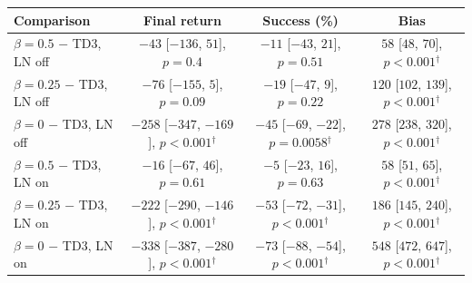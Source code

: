 \begin{tabular}{@{}lccc@{}}
\toprule
Comparison & Final return & Success (\%) & Bias \\
\midrule
$\beta = 0.5$ $-$ TD3, LN off & $-43$ {\scriptsize[$-136$, $51$]}, $p=0.4$ & $-11$ {\scriptsize[$-43$, $21$]}, $p=0.51$ & $58$ {\scriptsize[$48$, $70$]}, $p<0.001$$^\dagger$ \\
$\beta = 0.25$ $-$ TD3, LN off & $-76$ {\scriptsize[$-155$, $5$]}, $p=0.09$ & $-19$ {\scriptsize[$-47$, $9$]}, $p=0.22$ & $120$ {\scriptsize[$102$, $139$]}, $p<0.001$$^\dagger$ \\
$\beta = 0$ $-$ TD3, LN off & $-258$ {\scriptsize[$-347$, $-169$]}, $p<0.001$$^\dagger$ & $-45$ {\scriptsize[$-69$, $-22$]}, $p=0.0058$$^\dagger$ & $278$ {\scriptsize[$238$, $320$]}, $p<0.001$$^\dagger$ \\
$\beta = 0.5$ $-$ TD3, LN on & $-16$ {\scriptsize[$-67$, $46$]}, $p=0.61$ & $-5$ {\scriptsize[$-23$, $16$]}, $p=0.63$ & $58$ {\scriptsize[$51$, $65$]}, $p<0.001$$^\dagger$ \\
$\beta = 0.25$ $-$ TD3, LN on & $-222$ {\scriptsize[$-290$, $-146$]}, $p<0.001$$^\dagger$ & $-53$ {\scriptsize[$-72$, $-31$]}, $p<0.001$$^\dagger$ & $186$ {\scriptsize[$145$, $240$]}, $p<0.001$$^\dagger$ \\
$\beta = 0$ $-$ TD3, LN on & $-338$ {\scriptsize[$-387$, $-280$]}, $p<0.001$$^\dagger$ & $-73$ {\scriptsize[$-88$, $-54$]}, $p<0.001$$^\dagger$ & $548$ {\scriptsize[$472$, $647$]}, $p<0.001$$^\dagger$ \\
\bottomrule
\end{tabular}
